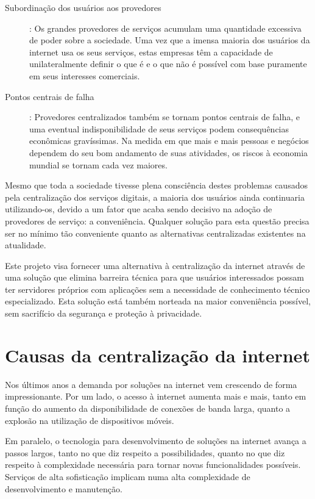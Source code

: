 \begin{anexosenv}
\begin{description}
  \item [Subordinação dos usuários aos provedores]: Os grandes provedores de 
serviços acumulam uma quantidade excessiva de poder
  sobre a sociedade. Uma vez que a imensa maioria dos usuários da internet usa
  os seus serviços, estas empresas têm a capacidade de unilateralmente definir
  o que é e o que não é possível com base puramente em seus interesses
  comerciais.
  
  \item [Pontos centrais de falha]: Provedores centralizados também se tornam 
  pontos centrais de falha, e uma
  eventual indisponibilidade de seus serviços podem consequências econômicas
  gravíssimas. Na medida em que mais e mais pessoas e negócios dependem do seu
  bom andamento de suas atividades, os riscos à economia mundial se tornam cada
  vez maiores.
\end{description}

Mesmo que toda a sociedade tivesse plena consciência destes problemas causados
pela centralização dos serviços digitais, a maioria dos usuários ainda
continuaria utilizando-os, devido a um fator que acaba sendo decisivo na adoção
de provedores de serviço: a conveniência. Qualquer solução para esta questão
precisa ser no mínimo tão conveniente quanto as alternativas centralizadas
existentes na atualidade.

Este projeto visa fornecer uma alternativa à centralização da internet através
de uma solução que elimina barreira técnica para que usuários interessados
possam ter servidores próprios com aplicações sem a necessidade de conhecimento
técnico especializado. Esta solução está também norteada na maior conveniência
possível, sem sacrifício da segurança e proteção à privacidade.

\section{Causas da centralização da internet}

Nos últimos anos a demanda por soluções na internet vem crescendo de forma
impressionante. Por um lado, o acesso à internet aumenta mais e mais, tanto em
função do aumento da disponibilidade de conexões de banda larga, quanto a
explosão na utilização de dispositivos móveis.

Em paralelo, o tecnologia para desenvolvimento de soluções na internet avança a
passos largos, tanto no que diz respeito a possibilidades, quanto no que diz
respeito à complexidade necessária para tornar novas funcionalidades possíveis.
Serviços de alta sofisticação implicam numa alta complexidade de
desenvolvimento e manutenção.


\end{anexosenv}
